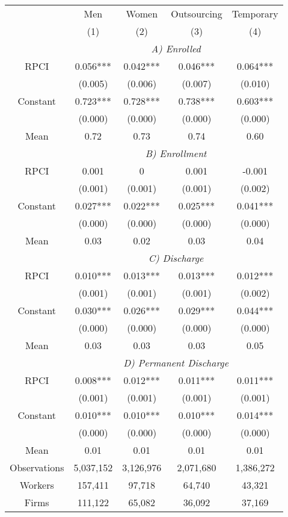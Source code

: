 \begin{tabular}{ccccc}
\toprule
\toprule
      & Men   & Women & Outsourcing & Temporary \\
      & (1)   & (2)   & (3)   & (4) \\
\cmidrule{2-5}      & \multicolumn{4}{c}{\textit{A) Enrolled}} \\
\midrule
RPCI  & 0.056*** & 0.042*** & 0.046*** & 0.064*** \\
      & (0.005) & (0.006) & (0.007) & (0.010) \\
Constant & 0.723*** & 0.728*** & 0.738*** & 0.603*** \\
      & (0.000) & (0.000) & (0.000) & (0.000) \\
Mean  & 0.72  & 0.73  & 0.74  & 0.60 \\
\cmidrule{2-5}      & \multicolumn{4}{c}{\textit{B) Enrollment}} \\
\midrule
RPCI  & 0.001 & 0     & 0.001 & -0.001 \\
      & (0.001) & (0.001) & (0.001) & (0.002) \\
Constant & 0.027*** & 0.022*** & 0.025*** & 0.041*** \\
      & (0.000) & (0.000) & (0.000) & (0.000) \\
Mean  & 0.03  & 0.02  & 0.03  & 0.04 \\
\cmidrule{2-5}      & \multicolumn{4}{c}{\textit{C) Discharge}} \\
\midrule
RPCI  & 0.010*** & 0.013*** & 0.013*** & 0.012*** \\
      & (0.001) & (0.001) & (0.001) & (0.002) \\
Constant & 0.030*** & 0.026*** & 0.029*** & 0.044*** \\
      & (0.000) & (0.000) & (0.000) & (0.000) \\
Mean  & 0.03  & 0.03  & 0.03  & 0.05 \\
\cmidrule{2-5}      & \multicolumn{4}{c}{\textit{D) Permanent Discharge}} \\
\midrule
RPCI  & 0.008*** & 0.012*** & 0.011*** & 0.011*** \\
      & (0.001) & (0.001) & (0.001) & (0.001) \\
Constant & 0.010*** & 0.010*** & 0.010*** & 0.014*** \\
      & (0.000) & (0.000) & (0.000) & (0.000) \\
Mean  & 0.01  & 0.01  & 0.01  & 0.01 \\
\midrule
Observations & 5,037,152 & 3,126,976 & 2,071,680 & 1,386,272 \\
Workers & 157,411 & 97,718 & 64,740 & 43,321 \\
Firms & 111,122 & 65,082 & 36,092 & 37,169 \\
\bottomrule
\bottomrule
\end{tabular}%
